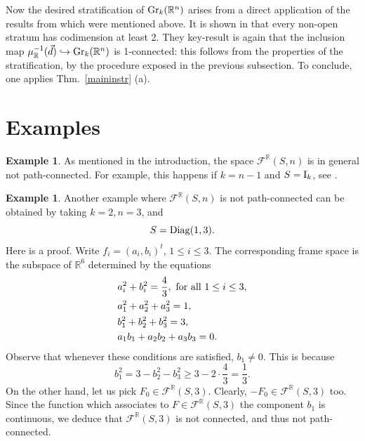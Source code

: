\documentclass[12pt]{amsart}
\theoremstyle{definition}
\newtheorem{ex}[thm]{Example}
\theoremstyle{remark}
\newcommand{\RR}{\mathbb R}
\begin{document}
Now  the desired stratification of ${\rm Gr}_k(\RR^n)$ arises from a direct application of the results from \cite{BaHe} which were mentioned above. 
It is shown in \cite[Prop.~4.1]{Ma1}  that  every non-open stratum has codimension at least 2.
They key-result is again that the inclusion map 
$
\mu_\RR^{-1}(\vec{d})\hookrightarrow
{\rm Gr}_k({\mathbb R}^n)
$
is 1-connected: this follows from the properties of the stratification, by the procedure exposed in the previous subsection.
To conclude, one applies Thm.~\ref{maininstr} (a). 

\section{Examples}

\begin{ex} \label{ex:nonconn} As mentioned in the introduction, the space ${\mathcal F}^\RR(S, n)$ is in general not path-connected. 
For example, this happens if $k=n-1$ and $S={\rm I}_k$, see \cite[Sect.~3]{DS}.
\end{ex}
\begin{ex} \label{ex:nonconn0}
Another  example where ${\mathcal F}^\RR(S, n)$ is not path-connected can be obtained by taking
 $k=2, n=3$, and
$$S={\rm Diag}(1,3).$$ Here is a proof. 
Write $f_i=(a_i, b_i)^t$, $1\le i \le 3$. The corresponding frame space is the subspace of $\RR^6$ determined by the equations
\begin{align*}
{}& a_i^2+b_i^2= \frac{4}{3}, \ {\rm for \ all } \ 1\le i \le 3, \\
{}& a_1^2+a_2^2+a_3^2=1, \\
{}& b_1^2+b_2^2+b_3^2=3, \\
{}& a_1b_1+a_2b_2+a_3b_3=0.
\end{align*}
Observe that whenever these conditions are satisfied, $b_1 \neq 0$.
This is because
$$b_1^2=3-b_2^2-b_3^2\ge 3-2\cdot \frac{4}{3}=\frac{1}{3}.$$
On the other hand, let us pick $F_0\in {\mathcal F}^\RR(S, 3)$. Clearly, $-F_0\in {\mathcal F}^\RR(S, 3)$ too. 
Since the function which associates to $F\in {\mathcal F}^\RR(S, 3)$ the component $b_1$ is continuous, we deduce that ${\mathcal F}^\RR(S, 3)$ is not connected, and thus not path-connected. 
\end{ex}
\end{document}
